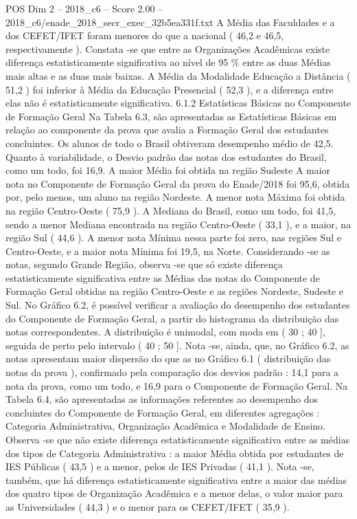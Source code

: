 \begin{textsample}{POS Dim 2 – 2018\_c6 – Score 2.00 – 2018\_c6/enade\_2018\_secr\_exec\_32b5ea331f.txt}
A Média das Faculdades e a dos CEFET/IFET foram menores do que a nacional ( 46,2 e 46,5, respectivamente ).
Constata -se que entre as Organizações Acadêmicas existe diferença estatisticamente significativa ao nível de 95 \% entre as duas Médias mais altas e as duas mais baixas.
A Média da Modalidade Educação a Distância ( 51,2 ) foi inferior à Média da Educação Presencial ( 52,3 ), e a diferença entre elas não é estatisticamente significativa. 6.1.2 Estatísticas Básicas no Componente de Formação Geral Na Tabela 6.3, são apresentadas as Estatísticas Básicas em relação ao componente da prova que avalia a Formação Geral dos estudantes concluintes.
Os alunos de todo o Brasil obtiveram desempenho médio de 42,5.
Quanto à variabilidade, o Desvio padrão das notas dos estudantes do Brasil, como um todo, foi 16,9.
A maior Média foi obtida na região Sudeste A maior nota no Componente de Formação Geral da prova do Enade/2018 foi 95,6, obtida por, pelo menos, um aluno na região Nordeste.
A menor nota Máxima foi obtida na região Centro-Oeste ( 75,9 ).
A Mediana do Brasil, como um todo, foi 41,5, sendo a menor Mediana encontrada na região Centro-Oeste ( 33,1 ), e a maior, na região Sul ( 44,6 ).
A menor nota Mínima nessa parte foi zero, nas regiões Sul e Centro-Oeste, e a maior nota Mínima foi 19,5, na Norte.
Considerando -se as notas, segundo Grande Região, observa -se que só existe diferença estatisticamente significativa entre as Médias das notas do Componente de Formação Geral obtidas na região Centro-Oeste e as regiões Nordeste, Sudeste e Sul.
No Gráfico 6.2, é possível verificar a avaliação do desempenho dos estudantes do Componente de Formação Geral, a partir do histograma da distribuição das notas correspondentes.
A distribuição é unimodal, com moda em ( 30 ; 40 ], seguida de perto pelo intervalo ( 40 ; 50 ].
Nota -se, ainda, que, no Gráfico 6.2, as notas apresentam maior dispersão do que as no Gráfico 6.1 ( distribuição das notas da prova ), confirmado pela comparação dos desvios padrão : 14,1 para a nota da prova, como um todo, e 16,9 para o Componente de Formação Geral.
Na Tabela 6.4, são apresentadas as informações referentes ao desempenho dos concluintes do Componente de Formação Geral, em diferentes agregações : Categoria Administrativa, Organização Acadêmica e Modalidade de Ensino.
Observa -se que não existe diferença estatisticamente significativa entre as médias dos tipos de Categoria Administrativa : a maior Média obtida por estudantes de IES Públicas ( 43,5 ) e a menor, pelos de IES Privadas ( 41,1 ).
Nota -se, também, que há diferença estatisticamente significativa entre a maior das médias dos quatro tipos de Organização Acadêmica e a menor delas, o valor maior para as Universidades ( 44,3 ) e o menor para os CEFET/IFET ( 35,9 ).

\end{textsample}

